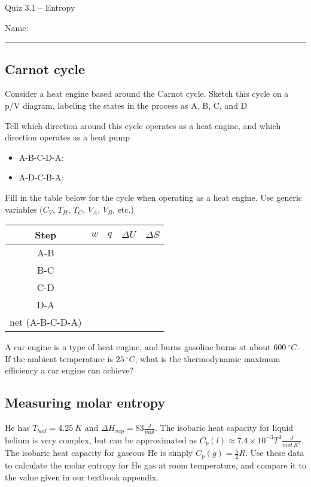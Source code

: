 \documentclass[11pt, letterpaper]{memoir}
\begin{document}
	\begin{center}
		{\large Quiz 3.1 -- Entropy}
	\end{center}
	{\large Name: \rule[-1mm]{4in}{.1pt} 
		
\subsection*{Carnot cycle}
Consider a heat engine based around the Carnot cycle. Sketch this cycle on a p/V diagram, labeling the states in the process as A, B, C, and D

\vspace{7em}\noindent
Tell which direction around this cycle operates as a heat engine, and which direction operates as a heat pump
\begin{itemize}
	\item A-B-C-D-A:
	\item A-D-C-B-A: 
\end{itemize}

\noindent
Fill in the table below for the cycle when operating as a heat engine. Use generic variables ($C_V$, $T_H$, $T_C$, $V_A$, $V_B$, etc.)

\noindent\hspace{-2em}
\begin{tabular}{|c|c|c|c|c|}
	\toprule
	Step & $w$ & $q$ & $\Delta U$ & $\Delta S$ \\ \midrule
	A-B & \hspace{1.25in} & \hspace{1.25in} & \hspace{1.25in} & \hspace{1.25in} \\ \midrule
	B-C &&&&\\ \midrule
	C-D &&&&\\ \midrule
	D-A &&&&\\ \midrule \midrule
	net (A-B-C-D-A) &&&& \\\bottomrule
\end{tabular}

\vspace{2em}
\noindent
A car engine is a type of heat engine, and burns gasoline burns at about $600~^\circ C$. If the ambient temperature is $25~^\circ C$, what is the thermodynamic maximum efficiency a car engine can achieve?

\vspace{6em}
\subsection*{Measuring molar entropy}
He has $T_{boil}=4.25~K$ and $\Delta H_{vap} = 83\frac{J}{mol}$. The isobaric heat capacity for liquid helium is very complex, but can be approximated as $C_p(l)\approx 7.4\times10^{-3}T^3\frac{J}{mol~K^4}$. The isobaric heat capacity for gaseous He is simply $C_p(g)=\frac{5}{2}R$. Use these data to calculate the molar entropy for He gas at room temperature, and compare it to the value given in our textbook appendix.

}
\end{document}
